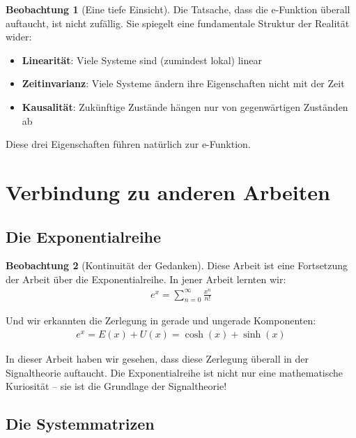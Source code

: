 ﻿\documentclass[a4paper,12pt]{report}
\theoremstyle{definition}
\newtheorem{beobachtung}{Beobachtung}
\begin{document}
	\begin{beobachtung}[Eine tiefe Einsicht]
		Die Tatsache, dass die e-Funktion überall auftaucht, ist nicht zufällig. Sie spiegelt eine fundamentale Struktur der Realität wider:
		
		\begin{itemize}
			\item[-] \textbf{Linearität}: Viele Systeme sind (zumindest lokal) linear
			\item[-] \textbf{Zeitinvarianz}: Viele Systeme ändern ihre Eigenschaften nicht mit der Zeit
			\item[-] \textbf{Kausalität}: Zukünftige Zustände hängen nur von gegenwärtigen Zuständen ab
		\end{itemize}
		
		Diese drei Eigenschaften führen natürlich zur e-Funktion.
	\end{beobachtung}
	
	\section{Verbindung zu anderen Arbeiten}
	
	\subsection{Die Exponentialreihe}
	
	\begin{beobachtung}[Kontinuität der Gedanken]
		Diese Arbeit ist eine Fortsetzung der Arbeit über die Exponentialreihe. In jener Arbeit lernten wir:
		\begin{align}
			e^x = \sum_{n=0}^{\infty} \frac{x^n}{n!}
		\end{align}
		
		Und wir erkannten die Zerlegung in gerade und ungerade Komponenten:
		\begin{align}
			e^x = E(x) + U(x) = \cosh(x) + \sinh(x)
		\end{align}
		
		In dieser Arbeit haben wir gesehen, dass diese Zerlegung überall in der Signaltheorie auftaucht. Die Exponentialreihe ist nicht nur eine mathematische Kuriosität -- sie ist die Grundlage der Signaltheorie!
	\end{beobachtung}
	
	\subsection{Die Systemmatrizen}
	
\end{document}

